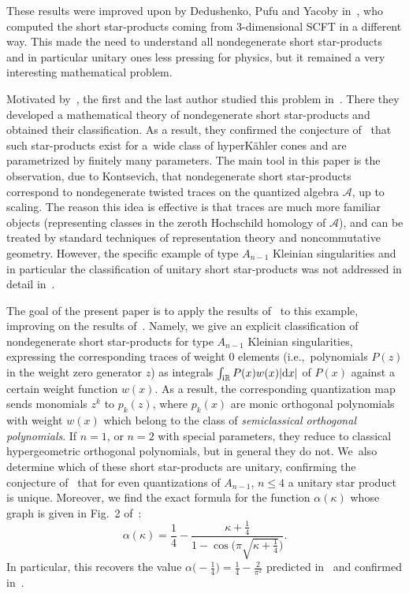 \documentclass[10pt,a4paper]{amsart}
\theoremstyle{definition}
\numberwithin{equation}{section}
\begin{document}
These results were improved upon by Dedushenko, Pufu and Yacoby in~\cite{DPY}, who computed the short star-products coming from 3-dimensional SCFT in a different way. This made the need to understand all nondegenerate short star-products and in particular unitary ones less pressing for physics, but it remained a very interesting mathematical problem.

Motivated by~\cite{BPR}, the first and the last author studied this problem in~\cite{ES}. There they developed a mathematical theory of nondegenerate short star-products and obtained their classification. As a result, they confirmed the conjecture of~\cite{BPR} that such star-products exist for a~wide class of hyperK\"ahler cones and are parametrized by finitely many parameters. The main tool in this paper is the observation, due to Kontsevich, that nondegenerate short star-products correspond to nondegenerate twisted traces on the quantized algebra $\mathcal A$, up to scaling. The reason this idea is effective is that traces are much more familiar objects (representing classes in the zeroth Hochschild homology of $\mathcal{A}$), and can be treated by standard techniques of representation theory and noncommutative geometry. However, the specific example of type $A_{n-1}$ Kleinian singularities and in particular the classification of unitary short star-products was not addressed in detail in~\cite{ES}.

The goal of the present paper is to apply the results of~\cite{ES} to this example, improving on the results of~\cite{BPR}. Namely, we give an explicit classification of nondegenerate short star-products for type $A_{n-1}$ Kleinian singularities, expressing the corresponding traces of weight $0$ elements (i.e.,~polynomials $P(z)$ in the weight zero generator $z$) as integrals $\int_{{\rm i}\mathbb R} P(x)w(x)|{\rm d}x|$ of $P(x)$ against a certain weight function $w(x)$. As a result, the corresponding quantization map sends monomials $z^k$ to $p_k(z)$, where $p_k(x)$ are monic orthogonal polynomials with weight $w(x)$ which belong to the class of {\it semiclassical orthogonal polynomials}. If $n=1$, or $n=2$ with special parameters, they reduce to classical hypergeometric orthogonal polynomials, but in general they do not. We~also determine which of these short star-products are unitary, confirming the conjecture of~\cite{BPR} that for even quantizations of $A_{n-1}$, $n\le 4$ a unitary star product is unique. Moreover, we find the exact formula for the function $\alpha(\kappa)$ whose graph is given in Fig.~2 of~\cite{BPR}:
\[
\alpha(\kappa)=\frac{1}{4}-\frac{\kappa+\frac{1}{4}}{1-\cos\big(\pi\sqrt{\kappa+\frac{1}{4}}\big)}.
\]
In particular, this recovers the value $\alpha\big({-}\frac{1}{4}\big)=\frac{1}{4}-\frac{2}{\pi^2}$ predicted in~\cite{BPR} and confirmed \mbox{in~\cite{DFPY,DPY}}.
\end{document}
